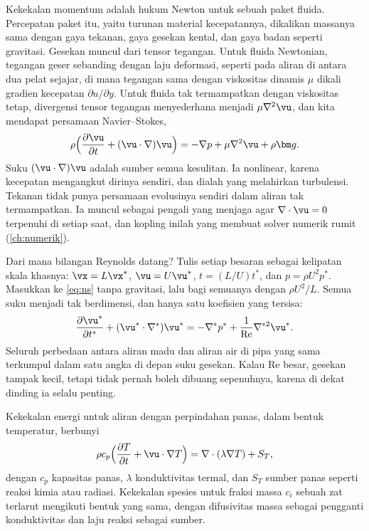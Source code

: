 Kekekalan momentum adalah hukum Newton untuk sebuah paket fluida. Percepatan paket itu, yaitu turunan
material kecepatannya, dikalikan massanya sama dengan gaya tekanan, gaya gesekan kental, dan gaya badan
seperti gravitasi. Gesekan muncul dari tensor tegangan. Untuk fluida Newtonian, tegangan geser sebanding
dengan laju deformasi, seperti pada aliran di antara dua pelat sejajar, di mana tegangan sama dengan
viskositas dinamis $\mu$ dikali gradien kecepatan $\partial u/\partial y$. Untuk fluida tak termampatkan
dengan viskositas tetap, divergensi tensor tegangan menyederhana menjadi $\mu\nabla^2\vu$, dan kita
mendapat persamaan Navier--Stokes,
\begin{equation}
\rho\Big(\frac{\partial\vu}{\partial t}+(\vu\cdot\nabla)\vu\Big)=-\nabla p+\mu\nabla^2\vu+\rho\bm g.
\label{eq:ns}
\end{equation}
Suku $(\vu\cdot\nabla)\vu$ adalah sumber semua kesulitan. Ia nonlinear, karena kecepatan mengangkut
dirinya sendiri, dan dialah yang melahirkan turbulensi. Tekanan tidak punya persamaan evolusinya
sendiri dalam aliran tak termampatkan. Ia muncul sebagai pengali yang menjaga agar $\nabla\cdot\vu=0$
terpenuhi di setiap saat, dan kopling inilah yang membuat solver numerik rumit (\cref{ch:numerik}).

Dari mana bilangan Reynolds datang? Tulis setiap besaran sebagai kelipatan skala khasnya: $\vx=L\vx^*$,
$\vu=U\vu^*$, $t=(L/U)t^*$, dan $p=\rho U^2p^*$. Masukkan ke \cref{eq:ns} tanpa gravitasi, lalu bagi
semuanya dengan $\rho U^2/L$. Semua suku menjadi tak berdimensi, dan hanya satu koefisien yang tersisa:
\begin{equation}
\frac{\partial\vu^*}{\partial t^*}+(\vu^*\cdot\nabla^*)\vu^*=-\nabla^*p^*+\frac1{\mathrm{Re}}\nabla^{*2}\vu^* .
\end{equation}
Seluruh perbedaan antara aliran madu dan aliran air di pipa yang sama terkumpul dalam satu angka di depan
suku gesekan. Kalau Re besar, gesekan tampak kecil, tetapi tidak pernah boleh dibuang sepenuhnya, karena
di dekat dinding ia selalu penting.

Kekekalan energi untuk aliran dengan perpindahan panas, dalam bentuk temperatur, berbunyi
\begin{equation}
\rho c_p\Big(\frac{\partial T}{\partial t}+\vu\cdot\nabla T\Big)=\nabla\cdot(\lambda\nabla T)+S_T,
\label{eq:energi}
\end{equation}
dengan $c_p$ kapasitas panas, $\lambda$ konduktivitas termal, dan $S_T$ sumber panas seperti reaksi
kimia atau radiasi. Kekekalan spesies untuk fraksi massa $c_i$ sebuah zat terlarut mengikuti bentuk
yang sama, dengan difusivitas massa sebagai pengganti konduktivitas dan laju reaksi sebagai sumber.

